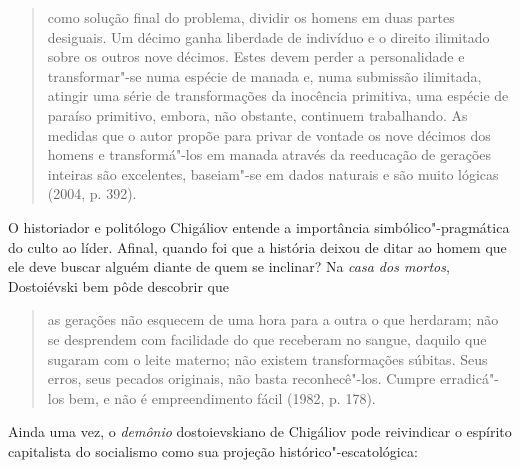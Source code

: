 \begin{quote}
como solução final do problema, dividir os homens em duas partes
desiguais. Um décimo ganha liberdade de indivíduo e o direito ilimitado
sobre os outros nove décimos. Estes devem perder a personalidade e
transformar"-se numa espécie de manada e, numa submissão ilimitada,
atingir uma série de transformações da inocência primitiva, uma espécie
de paraíso primitivo, embora, não obstante, continuem trabalhando. As
medidas que o autor propõe para privar de vontade os nove décimos dos
homens e transformá"-los em manada através da reeducação de gerações
inteiras são excelentes, baseiam"-se em dados naturais e são muito
lógicas (2004, p. 392).
\end{quote}

O historiador e politólogo Chigáliov entende a importância
simbólico"-pragmática do culto ao líder. Afinal, quando foi que a
história deixou de ditar ao homem que ele deve buscar alguém diante de
quem se inclinar? Na \emph{casa dos mortos}, Dostoiévski bem pôde
descobrir que

\begin{quote}
as gerações não esquecem de uma hora para a outra o que herdaram; não se
desprendem com facilidade do que receberam no sangue, daquilo que
sugaram com o leite materno; não existem transformações súbitas. Seus
erros, seus pecados originais, não basta reconhecê"-los. Cumpre
erradicá"-los bem, e não é empreendimento fácil (1982, p. 178).
\end{quote}

Ainda uma vez, o \emph{demônio} dostoievskiano de Chigáliov pode
reivindicar o espírito capitalista do socialismo como sua projeção
histórico"-escatológica:

